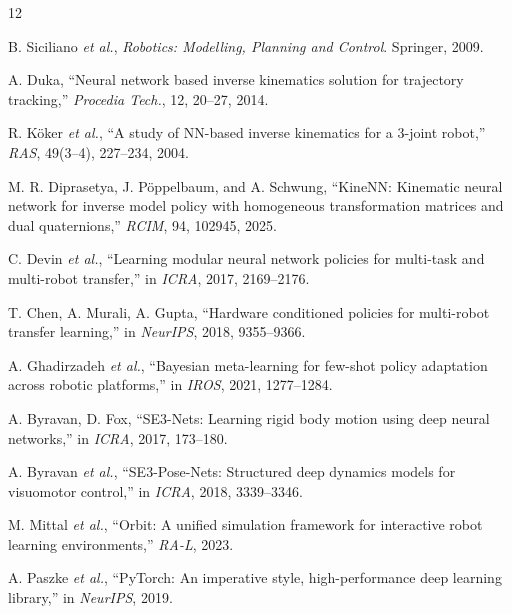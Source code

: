 \documentclass[conference]{IEEEtran}
\begin{document}
\begin{thebibliography}{12}
\setlength{\itemsep}{1pt plus 1pt}

B. Siciliano \emph{et al.}, \emph{Robotics: Modelling, Planning and Control}. Springer, 2009.

A. Duka, ``Neural network based inverse kinematics solution for trajectory tracking,'' \emph{Procedia Tech.}, 12, 20--27, 2014.

R. K{\"o}ker \emph{et al.}, ``A study of NN-based inverse kinematics for a 3-joint robot,'' \emph{RAS}, 49(3--4), 227--234, 2004.

M. R. Diprasetya, J. P{\"o}ppelbaum, and A. Schwung, ``KineNN: Kinematic neural network for inverse model policy with homogeneous transformation matrices and dual quaternions,'' \emph{RCIM}, 94, 102945, 2025.

C. Devin \emph{et al.}, ``Learning modular neural network policies for multi-task and multi-robot transfer,'' in \emph{ICRA}, 2017, 2169--2176.

T. Chen, A. Murali, A. Gupta, ``Hardware conditioned policies for multi-robot transfer learning,'' in \emph{NeurIPS}, 2018, 9355--9366.

A. Ghadirzadeh \emph{et al.}, ``Bayesian meta-learning for few-shot policy adaptation across robotic platforms,'' in \emph{IROS}, 2021, 1277--1284.

A. Byravan, D. Fox, ``SE3-Nets: Learning rigid body motion using deep neural networks,'' in \emph{ICRA}, 2017, 173--180.

A. Byravan \emph{et al.}, ``SE3-Pose-Nets: Structured deep dynamics models for visuomotor control,'' in \emph{ICRA}, 2018, 3339--3346.

M. Mittal \emph{et al.}, ``Orbit: A unified simulation framework for interactive robot learning environments,'' \emph{RA-L}, 2023.

A. Paszke \emph{et al.}, ``PyTorch: An imperative style, high-performance deep learning library,'' in \emph{NeurIPS}, 2019.

\end{thebibliography}
\end{document}
